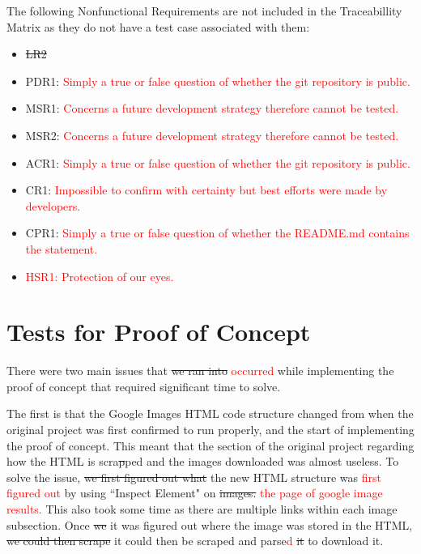 \documentclass[12pt, titlepage]{article}
\begin{document}
The following Nonfunctional Requirements are not included in the Traceabillity Matrix as they do not have a test case associated with them:
\begin{itemize}
    \item \sout{LR2}
    \item PDR1: \textcolor{red}{Simply a true or false question of whether the git repository is public.}
    \item MSR1: \textcolor{red}{Concerns a future development strategy therefore cannot be tested.}
    \item MSR2: \textcolor{red}{Concerns a future development strategy therefore cannot be tested.}
    \item ACR1: \textcolor{red}{Simply a true or false question of whether the git repository is public.}
    \item CR1:  \textcolor{red}{Impossible to confirm with certainty but best efforts were made by developers.}
    \item CPR1: \textcolor{red}{Simply a true or false question of whether the README.md contains the statement.}
    \item \textcolor{red}{HSR1:} \textcolor{red}{Protection of our eyes.} 
\end{itemize}

\section{Tests for Proof of Concept}

There were two main issues that \sout{we ran into} \textcolor{red}{occurred} while implementing the proof of concept 
that required significant time to solve.

The first is that the Google Images HTML code structure changed from when the original project was first confirmed 
to run properly, and the start of implementing the proof of concept. This meant that the section of the original 
project regarding how the HTML is scra\sout{p}ped and the images downloaded was almost useless. To solve the issue, 
\sout{we first figured out what} the new HTML structure was \textcolor{red}{first figured out} by using 
``Inspect Element" on \sout{images.} \textcolor{red}{the page of google image results.} This also took some time as 
there are multiple links within each image subsection. Once \sout{we} it was figured out where the image was 
stored in the HTML, \sout{we could then scrape} it could then be scraped and parse\textcolor{red}{d} \sout{it} to download it.
\end{document}
